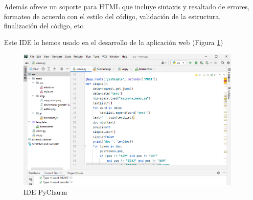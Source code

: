 Además ofrece un soporte para HTML que incluye sintaxis y resaltado de errores, formateo de acuerdo con el estilo del código, validación de la estructura, finalización del código, etc.

Este IDE lo hemos usado en el desarrollo de la aplicación web (Figura \ref{fig:pycharm})
	\begin{figure}[h!]
	\centering
	
	
	\includegraphics[scale=0.5]{Imagenes/Figuras/pycharm}
	
	
	\caption{IDE PyCharm}
	\label{fig:pycharm}
\end{figure}